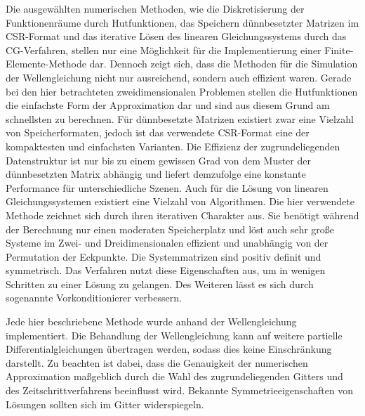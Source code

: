 \documentclass{article}
\begin{document}
    Die ausgewählten numerischen Methoden, wie die Diskretisierung der Funktionenräume durch Hutfunktionen, das Speichern dünnbesetzter Matrizen im CSR-Format und das iterative Lösen des linearen Gleichungssystems durch das CG-Verfahren, stellen nur eine Möglichkeit für die Implementierung einer Finite-Elemente-Methode dar.
    Dennoch zeigt sich, dass die Methoden für die Simulation der Wellengleichung nicht nur ausreichend, sondern auch effizient waren.
    Gerade bei den hier betrachteten zweidimensionalen Problemen stellen die Hutfunktionen die einfachste Form der Approximation dar und sind aus diesem Grund am schnellsten zu berechnen.
    Für dünnbesetzte Matrizen existiert zwar eine Vielzahl von Speicherformaten, jedoch ist das verwendete CSR-Format eine der kompaktesten und einfachsten Varianten.
    Die Effizienz der zugrundeliegenden Datenstruktur ist nur bis zu einem gewissen Grad von dem Muster der dünnbesetzten Matrix abhängig und liefert demzufolge eine konstante Performance für unterschiedliche Szenen.
    Auch für die Lösung von linearen Gleichungssystemen existiert eine Vielzahl von Algorithmen.
    Die hier verwendete Methode zeichnet sich durch ihren iterativen Charakter aus.
    Sie benötigt während der Berechnung nur einen moderaten Speicherplatz und löst auch sehr große Systeme im Zwei- und Dreidimensionalen effizient und unabhängig von der Permutation der Eckpunkte.
    Die Systemmatrizen sind positiv definit und symmetrisch.
    Das Verfahren nutzt diese Eigenschaften aus, um in wenigen Schritten zu einer Lösung zu gelangen.
    Des Weiteren lässt es sich durch sogenannte Vorkonditionierer verbessern.

    Jede hier beschriebene Methode wurde anhand der Wellengleichung implementiert.
    Die Behandlung der Wellengleichung kann auf weitere partielle Differentialgleichungen übertragen werden, sodass dies keine Einschränkung darstellt.
    Zu beachten ist dabei, dass die Genauigkeit der numerischen Approximation maßgeblich durch die Wahl des zugrundeliegenden Gitters und des Zeitschrittverfahrens beeinflusst wird.
    Bekannte Symmetrieeigenschaften von Lösungen sollten sich im Gitter widerspiegeln.
\end{document}
